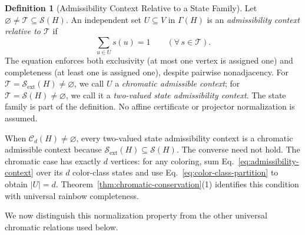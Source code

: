 \documentclass[aps,pra,reprint,superscriptaddress,longbibliography,nofootinbib,floatfix,10pt]{revtex4-2}
\theoremstyle{definition}\newtheorem{definition}[theorem]{Definition}
\theoremstyle{remark}\newtheorem{remark}[theorem]{Remark}
\newcommand{\Sc}{\mathcal S}\newcommand{\Cc}{\mathcal C}\newcommand{\Wc}{\mathcal W}
\begin{document}
\begin{definition}[Admissibility Context Relative to a State Family]\label{def:admissibility-context}
Let $\varnothing\neq\mathcal T\subseteq\Sc(H)$. An independent set $U\subseteq V$ in $\Gamma(H)$ is an \emph{admissibility context relative to $\mathcal T$} if
\begin{equation}\label{eq:admissibility-context}
\sum_{u\in U}s(u)=1\qquad(\forall\,s\in\mathcal T).
\end{equation}
The equation enforces both exclusivity (at most one vertex is assigned one) and completeness (at least one is assigned one), despite pairwise nonadjacency. For $\mathcal T=\Sc_{\mathrm{ext}}(H)\neq\varnothing$, we call $U$ a \emph{chromatic admissible context}; for $\mathcal T=\Sc(H)\neq\varnothing$, we call it a \emph{two-valued state admissibility context}. The state family is part of the definition. No affine certificate or projector normalization is assumed.
\end{definition}

When $\Cc_d(H)\neq\varnothing$, every two-valued state admissibility context is a chromatic admissible context because $\Sc_{\mathrm{ext}}(H)\subseteq\Sc(H)$. The converse need not hold. The chromatic case has exactly $d$ vertices: for any coloring, sum Eq.~\eqref{eq:admissibility-context} over its $d$ color-class states and use Eq.~\eqref{eq:color-class-partition} to obtain $|U|=d$. Theorem~\ref{thm:chromatic-conservation}(1) identifies this condition with universal rainbow completeness.

We now distinguish this normalization property from the other universal chromatic relations used below.
\end{document}
